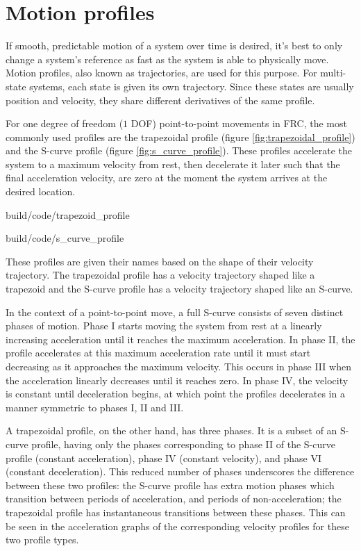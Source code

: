 \section{Motion profiles}

If smooth, predictable motion of a system over time is desired, it's best to
only change a system's reference as fast as the system is able to physically
move. Motion profiles, also known as trajectories, are used for this purpose.
For multi-state systems, each state is given its own trajectory. Since these
states are usually position and velocity, they share different derivatives of
the same profile.

For one degree of freedom ($1$ DOF) point-to-point movements in FRC, the most
commonly used profiles are the trapezoidal profile (figure
\ref{fig:trapezoidal_profile}) and the S-curve profile (figure
\ref{fig:s_curve_profile}). These profiles accelerate the system to a maximum
velocity from rest, then decelerate it later such that the final acceleration
velocity, are zero at the moment the system arrives at the desired location.

\begin{svg}{build/code/trapezoid_profile}
  \caption{Trapezoidal profile}
  \label{fig:trapezoidal_profile}
\end{svg}

\begin{svg}{build/code/s_curve_profile}
  \caption{S-curve profile}
  \label{fig:s_curve_profile}
\end{svg}

These profiles are given their names based on the shape of their velocity
trajectory. The trapezoidal profile has a velocity trajectory shaped like a
trapezoid and the S-curve profile has a velocity trajectory shaped like an
S-curve.

In the context of a point-to-point move, a full S-curve consists of seven
distinct phases of motion. Phase I starts moving the system from rest at a
linearly increasing acceleration until it reaches the maximum acceleration. In
phase II, the profile accelerates at this maximum acceleration rate until it
must start decreasing as it approaches the maximum velocity. This occurs in
phase III when the acceleration linearly decreases until it reaches zero. In
phase IV, the velocity is constant until deceleration begins, at which point the
profiles decelerates in a manner symmetric to phases I, II and III.

A trapezoidal profile, on the other hand, has three phases. It is a subset of an
S-curve profile, having only the phases corresponding to phase II of the S-curve
profile (constant acceleration), phase IV (constant velocity), and phase VI
(constant deceleration). This reduced number of phases underscores the
difference between these two profiles: the S-curve profile has extra motion
phases which transition between periods of acceleration, and periods of
non-acceleration; the trapezoidal profile has instantaneous transitions between
these phases. This can be seen in the acceleration graphs of the corresponding
velocity profiles for these two profile types.


